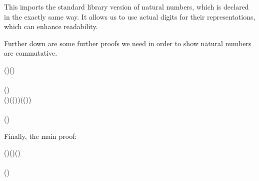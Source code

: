 \begin{hscode}\SaveRestoreHook
{}%
%
%
\>[3]{}\;\;\<[E]%
\ColumnHook
\end{hscode}\resethooks

  This imports the standard library version of natural numbers, which is declared in the exactly same way.
  It allows us to use actual digits for their representations, which can enhance readability.

  Further down are some further proofs we need in order to show natural numbers are commutative.

\begin{hscode}\SaveRestoreHook
{}%
%
%
\>[3]{}\mathbin{+}\mathbin{:}(\mathbin{:})(\mathbin{+})\<[E]%
\\
\>[3]{}\mathbin{+}\;\mathrel{=}\<[E]%
\\
\>[3]{}\mathbin{+}\;(\;)\;\mathbin{+}\;\mathrel{=}\<[E]%
\\[\blanklineskip]%
\>[3]{}\mathbin{+}\mathbin{:}(\;\mathbin{:})(\mathbin{+}(\;))(\;(\mathbin{+})){}\<[E]%
\\
\>[3]{}\mathbin{+}\;\;\mathrel{=}\<[E]%
\\
\>[3]{}\mathbin{+}\;(\;)\;\;\mathbin{+}\;\;\mathrel{=}\<[E]%
\ColumnHook
\end{hscode}\resethooks

  Finally, the main proof:

\begin{hscode}\SaveRestoreHook
{}%
%
%
%
\>[3]{}\mathbin{+}\mathbin{:}(\;\mathbin{:})(\mathbin{+})(\mathbin{+}){}\<[E]%
\\
\>[3]{}\mathbin{+}\;\;\;\mathbin{+}\;\mathrel{=}\<[E]%
\\
\>[3]{}\mathbin{+}\;(\;)\;\;\mathbin{+}\;\;\mid {}\<[E]%
\\
\>[3]{}\<[27]%
\>[27]{}\mathbin{+}\;\;\mid {}\<[E]%
\\
\>[3]{}\<[27]%
\>[27]{}\mathbin{+}\;\;\mathrel{=}\<[E]%
\ColumnHook
\end{hscode}\resethooks

